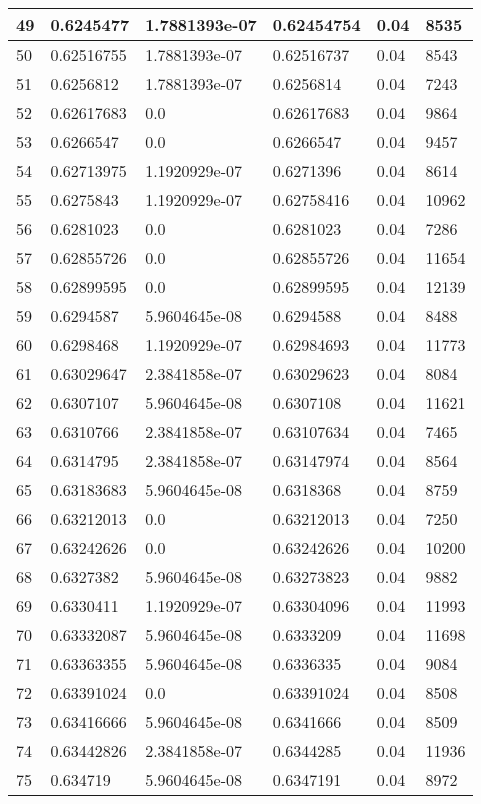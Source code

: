 \begin{longtable}{|l|l|l|l|l|l|}
49 & 0.6245477 & 1.7881393e-07 & 0.62454754 & 0.04 & 8535 \\ \hline 
50 & 0.62516755 & 1.7881393e-07 & 0.62516737 & 0.04 & 8543 \\ \hline 
51 & 0.6256812 & 1.7881393e-07 & 0.6256814 & 0.04 & 7243 \\ \hline 
52 & 0.62617683 & 0.0 & 0.62617683 & 0.04 & 9864 \\ \hline 
53 & 0.6266547 & 0.0 & 0.6266547 & 0.04 & 9457 \\ \hline 
54 & 0.62713975 & 1.1920929e-07 & 0.6271396 & 0.04 & 8614 \\ \hline 
55 & 0.6275843 & 1.1920929e-07 & 0.62758416 & 0.04 & 10962 \\ \hline 
56 & 0.6281023 & 0.0 & 0.6281023 & 0.04 & 7286 \\ \hline 
57 & 0.62855726 & 0.0 & 0.62855726 & 0.04 & 11654 \\ \hline 
58 & 0.62899595 & 0.0 & 0.62899595 & 0.04 & 12139 \\ \hline 
59 & 0.6294587 & 5.9604645e-08 & 0.6294588 & 0.04 & 8488 \\ \hline 
60 & 0.6298468 & 1.1920929e-07 & 0.62984693 & 0.04 & 11773 \\ \hline 
61 & 0.63029647 & 2.3841858e-07 & 0.63029623 & 0.04 & 8084 \\ \hline 
62 & 0.6307107 & 5.9604645e-08 & 0.6307108 & 0.04 & 11621 \\ \hline 
63 & 0.6310766 & 2.3841858e-07 & 0.63107634 & 0.04 & 7465 \\ \hline 
64 & 0.6314795 & 2.3841858e-07 & 0.63147974 & 0.04 & 8564 \\ \hline 
65 & 0.63183683 & 5.9604645e-08 & 0.6318368 & 0.04 & 8759 \\ \hline 
66 & 0.63212013 & 0.0 & 0.63212013 & 0.04 & 7250 \\ \hline 
67 & 0.63242626 & 0.0 & 0.63242626 & 0.04 & 10200 \\ \hline 
68 & 0.6327382 & 5.9604645e-08 & 0.63273823 & 0.04 & 9882 \\ \hline 
69 & 0.6330411 & 1.1920929e-07 & 0.63304096 & 0.04 & 11993 \\ \hline 
70 & 0.63332087 & 5.9604645e-08 & 0.6333209 & 0.04 & 11698 \\ \hline 
71 & 0.63363355 & 5.9604645e-08 & 0.6336335 & 0.04 & 9084 \\ \hline 
72 & 0.63391024 & 0.0 & 0.63391024 & 0.04 & 8508 \\ \hline 
73 & 0.63416666 & 5.9604645e-08 & 0.6341666 & 0.04 & 8509 \\ \hline 
74 & 0.63442826 & 2.3841858e-07 & 0.6344285 & 0.04 & 11936 \\ \hline 
75 & 0.634719 & 5.9604645e-08 & 0.6347191 & 0.04 & 8972 \\ \hline 
\end{longtable}